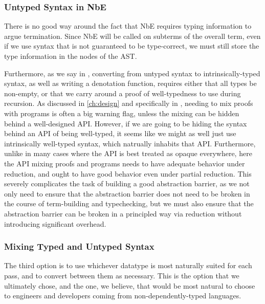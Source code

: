 \subsubsection{Untyped Syntax in NbE}\label{sec:rewriting-more:AST:untyped-nbe}
There is no good way around the fact that NbE requires typing information to argue termination.
Since NbE will be called on subterms of the overall term, even if we use syntax that is not guaranteed to be type-correct, we must still store the type information in the nodes of the AST.

Furthermore, as we say in , converting from untyped syntax to intrinsically-typed syntax, as well as writing a denotation function, requires either that all types be non-empty, or that we carry around a proof of well-typedness to use during recursion.
As discussed in \autoref{ch:design} and specifically in , needing to mix proofs with programs is often a big warning flag, unless the mixing can be hidden behind a well-designed API.
However, if we are going to be hiding the syntax behind an API of being well-typed, it seems like we might as well just use intrinsically well-typed syntax, which natrually inhabits that API.
Furthermore, unlike in many cases where the API is best treated as opaque everywhere, here the API mixing proofs and programs needs to have adequate behavior under reduction, and ought to have good behavior even under partial reduction.
This severely complicates the task of building a good abstraction barrier, as we not only need to ensure that the abstraction barrier does not need to be broken in the course of term-building and typechecking, but we must also ensure that the abstraction barrier can be broken in a principled way via reduction without introducing significant overhead.


\subsubsection{Mixing Typed and Untyped Syntax}\label{sec:rewriting-more:AST:both}
The third option is to use whichever datatype is most naturally suited for each pass, and to convert between them as necessary.
This is the option that we ultimately chose, and the one, we believe, that would be most natural to choose to engineers and developers coming from non-dependently-typed languages.


